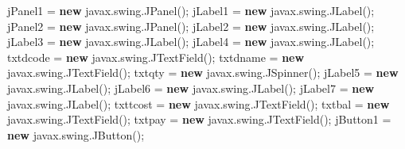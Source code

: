 \documentclass[
  10pt,
]{article}
\newenvironment{Shaded}{}{}
\newcommand{\FunctionTok}[1]{\textcolor[rgb]{0.02,0.16,0.49}{#1}}
\newcommand{\KeywordTok}[1]{\textcolor[rgb]{0.00,0.44,0.13}{\textbf{#1}}}
\newcommand{\NormalTok}[1]{#1}
\newcommand{\OperatorTok}[1]{\textcolor[rgb]{0.40,0.40,0.40}{#1}}
\begin{document}
\begin{Shaded}
\begin{Highlighting}[numbers=left,,]
\NormalTok{        jPanel1 }\OperatorTok{=} \KeywordTok{new}\NormalTok{ javax}\OperatorTok{.}\FunctionTok{swing}\OperatorTok{.}\FunctionTok{JPanel}\OperatorTok{();}
\NormalTok{        jLabel1 }\OperatorTok{=} \KeywordTok{new}\NormalTok{ javax}\OperatorTok{.}\FunctionTok{swing}\OperatorTok{.}\FunctionTok{JLabel}\OperatorTok{();}
\NormalTok{        jPanel2 }\OperatorTok{=} \KeywordTok{new}\NormalTok{ javax}\OperatorTok{.}\FunctionTok{swing}\OperatorTok{.}\FunctionTok{JPanel}\OperatorTok{();}
\NormalTok{        jLabel2 }\OperatorTok{=} \KeywordTok{new}\NormalTok{ javax}\OperatorTok{.}\FunctionTok{swing}\OperatorTok{.}\FunctionTok{JLabel}\OperatorTok{();}
\NormalTok{        jLabel3 }\OperatorTok{=} \KeywordTok{new}\NormalTok{ javax}\OperatorTok{.}\FunctionTok{swing}\OperatorTok{.}\FunctionTok{JLabel}\OperatorTok{();}
\NormalTok{        jLabel4 }\OperatorTok{=} \KeywordTok{new}\NormalTok{ javax}\OperatorTok{.}\FunctionTok{swing}\OperatorTok{.}\FunctionTok{JLabel}\OperatorTok{();}
\NormalTok{        txtdcode }\OperatorTok{=} \KeywordTok{new}\NormalTok{ javax}\OperatorTok{.}\FunctionTok{swing}\OperatorTok{.}\FunctionTok{JTextField}\OperatorTok{();}
\NormalTok{        txtdname }\OperatorTok{=} \KeywordTok{new}\NormalTok{ javax}\OperatorTok{.}\FunctionTok{swing}\OperatorTok{.}\FunctionTok{JTextField}\OperatorTok{();}
\NormalTok{        txtqty }\OperatorTok{=} \KeywordTok{new}\NormalTok{ javax}\OperatorTok{.}\FunctionTok{swing}\OperatorTok{.}\FunctionTok{JSpinner}\OperatorTok{();}
\NormalTok{        jLabel5 }\OperatorTok{=} \KeywordTok{new}\NormalTok{ javax}\OperatorTok{.}\FunctionTok{swing}\OperatorTok{.}\FunctionTok{JLabel}\OperatorTok{();}
\NormalTok{        jLabel6 }\OperatorTok{=} \KeywordTok{new}\NormalTok{ javax}\OperatorTok{.}\FunctionTok{swing}\OperatorTok{.}\FunctionTok{JLabel}\OperatorTok{();}
\NormalTok{        jLabel7 }\OperatorTok{=} \KeywordTok{new}\NormalTok{ javax}\OperatorTok{.}\FunctionTok{swing}\OperatorTok{.}\FunctionTok{JLabel}\OperatorTok{();}
\NormalTok{        txttcost }\OperatorTok{=} \KeywordTok{new}\NormalTok{ javax}\OperatorTok{.}\FunctionTok{swing}\OperatorTok{.}\FunctionTok{JTextField}\OperatorTok{();}
\NormalTok{        txtbal }\OperatorTok{=} \KeywordTok{new}\NormalTok{ javax}\OperatorTok{.}\FunctionTok{swing}\OperatorTok{.}\FunctionTok{JTextField}\OperatorTok{();}
\NormalTok{        txtpay }\OperatorTok{=} \KeywordTok{new}\NormalTok{ javax}\OperatorTok{.}\FunctionTok{swing}\OperatorTok{.}\FunctionTok{JTextField}\OperatorTok{();}
\NormalTok{        jButton1 }\OperatorTok{=} \KeywordTok{new}\NormalTok{ javax}\OperatorTok{.}\FunctionTok{swing}\OperatorTok{.}\FunctionTok{JButton}\OperatorTok{();}

\end{Highlighting}
\end{Shaded}
\end{document}
